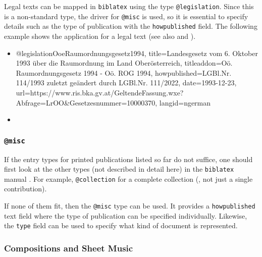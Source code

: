Legal texts can be mapped in \texttt{biblatex} using the type
\texttt{@legislation}. Since this is a non-standard type, the driver for
\texttt{@misc} is used, so it is essential to specify details such as the type
of publication with the \texttt{howpublished} field. The following example shows
the application for a legal text (see also \cite{FhStG1993} and
\cite{EuRichtlinie2000}).
%
\begin{itemize}
\item[]
\begin{GenericCode}[numbers=none]
@legislation{OoeRaumordnungsgesetz1994,
  title={Landesgesetz vom 6. Oktober 1993 über die Raumordnung im Land Oberösterreich},
  titleaddon={Oö. Raumordnungsgesetz 1994 - Oö. ROG 1994},
  howpublished={LGBl.Nr. 114/1993 zuletzt geändert durch LGBl.Nr. 111/2022},
  date={1993-12-23},
  url={https://www.ris.bka.gv.at/GeltendeFassung.wxe?Abfrage=LrOO&Gesetzesnummer=10000370},
  langid={ngerman}
}
\end{GenericCode}
\item[\cite{OoeRaumordnungsgesetz1994}] 
\end{itemize}
%


\subsubsection{\texttt{\bfseries @misc}}
\label{sec:@misc}

If the entry types for printed publications listed so far do not suffice, one
should first look at the other types (not described in detail here) in the
\texttt{biblatex} manual \cite{Kime2024}. For example, \texttt{@collection} for
a complete collection (\ie, not just a single contribution).

If none of them fit, then the \texttt{@misc} type can be used. It provides a
\texttt{howpublished} text field where the type of publication can be specified
individually. Likewise, the \texttt{type} field can be used to specify what kind
of document is represented.


\subsubsection{Compositions and Sheet Music}
\label{sec:sheet-music}

